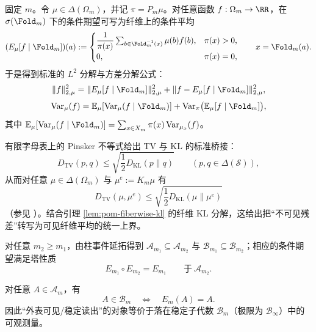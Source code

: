 固定 $m$。令 $\mu\in\Delta(\Omega_m)$，并记 $\pi=P_m\mu$。对任意函数 $f:\Omega_m\to\RR$，在 $\sigma(\Fold_m)$ 下的条件期望可写为纤维上的条件平均
\begin{equation}
\label{eq:pom-Emu-def}
(E_{\mu}[f\mid\Fold_m])(a)
:=
\begin{cases}
\dfrac{1}{\pi(x)}\sum_{b\in\Fold_m^{-1}(x)}\mu(b)f(b),& \pi(x)>0,\\
0,& \pi(x)=0,
\end{cases}
\qquad x=\Fold_m(a).
\end{equation}
于是得到标准的 $L^2$ 分解与方差分解公式：
\begin{equation}
\label{eq:pom-Emu-pythagoras}
\|f\|_{2,\mu}^2=\|E_{\mu}[f\mid\Fold_m]\|_{2,\mu}^2+\|f-E_{\mu}[f\mid\Fold_m]\|_{2,\mu}^2,
\end{equation}
\begin{equation}
\label{eq:pom-var-decomposition}
\mathrm{Var}_{\mu}(f)=\mathbb{E}_{\mu}[\mathrm{Var}_{\mu}(f\mid\Fold_m)]+\mathrm{Var}_{\pi}\bigl(\mathbb{E}_{\mu}[f\mid\Fold_m]\bigr),
\end{equation}
其中 $\mathbb{E}_{\mu}[\mathrm{Var}_{\mu}(f\mid\Fold_m)]=\sum_{x\in X_m}\pi(x)\,\mathrm{Var}_{\mu_x}(f)$。

有限字母表上的 Pinsker 不等式给出 TV 与 KL 的标准桥接：
\begin{equation}
\label{eq:pinsker-tv-kl}
D_{\mathrm{TV}}(p,q)\le \sqrt{\frac{1}{2}D_{\mathrm{KL}}(p\|q)}\qquad (p,q\in\Delta(\mathcal{S})),
\end{equation}
从而对任意 $\mu\in\Delta(\Omega_m)$ 与 $\mu^e:=K_m\mu$ 有
\begin{equation}
\label{eq:pom-residual-tv-by-kl}
D_{\mathrm{TV}}(\mu,\mu^e)\le \sqrt{\frac{1}{2}D_{\mathrm{KL}}(\mu\|\mu^e)}
\end{equation}
（参见 \cite{CoverThomas2006,Tsybakov2009Nonparametric}）。结合引理 \ref{lem:pom-fiberwise-kl} 的纤维 KL 分解，这给出把“不可见残差”转写为可见纤维平均的统一上界。

对任意 $m_2\ge m_1$，由柱事件延拓得到 $\mathcal{A}_{m_1}\subseteq \mathcal{A}_{m_2}$ 与 $\mathcal{B}_{m_1}\subseteq \mathcal{B}_{m_2}$；相应的条件期望满足塔性质
\[
E_{m_1}\circ E_{m_2}=E_{m_1}\qquad\text{于}\ \mathcal{A}_{m_2}.
\]

\begin{remark}[本体可见性判据]\label{rem:pom-visible-criterion}
对任意 $A\in\mathcal{A}_m$，有
\[
A\in\mathcal{B}_m\quad\Longleftrightarrow\quad E_m(A)=A.
\]
因此“外表可见/稳定读出”的对象等价于落在稳定子代数 $\mathcal{B}_m$（极限为 $\mathcal{B}_\infty$）中的可观测量。
\end{remark}

